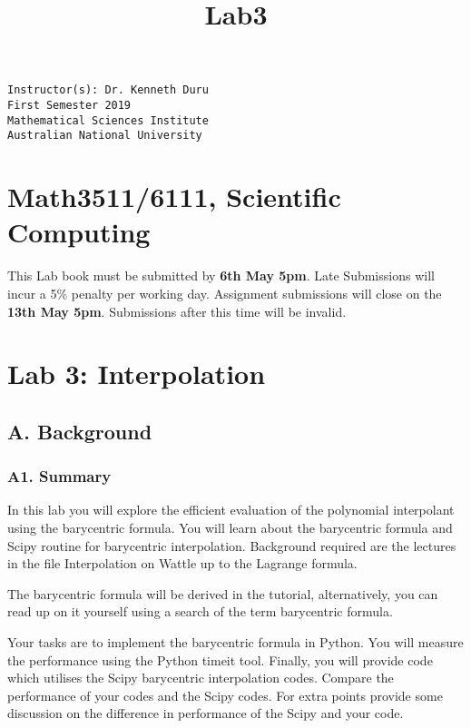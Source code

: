 \documentclass[11pt]{article}
\title{Lab3}
\begin{document}
    
    
    \maketitle
    
    

    
    \begin{verbatim}
Instructor(s): Dr. Kenneth Duru
First Semester 2019
Mathematical Sciences Institute
Australian National University
\end{verbatim}

\section{Math3511/6111, Scientific
Computing}\label{math35116111-scientific-computing}

This Lab book must be submitted by \textbf{6th May 5pm}. Late
Submissions will incur a 5\% penalty per working day. Assignment
submissions will close on the \textbf{13th May 5pm}. Submissions after
this time will be invalid.

\section{Lab 3: Interpolation}\label{lab-3-interpolation}

    \subsection{A. Background}\label{a.-background}

\subsubsection{A1. Summary}\label{a1.-summary}

In this lab you will explore the efficient evaluation of the polynomial
interpolant using the barycentric formula. You will learn about the
barycentric formula and Scipy routine for barycentric interpolation.
Background required are the lectures in the file Interpolation on Wattle
up to the Lagrange formula.

The barycentric formula will be derived in the tutorial, alternatively,
you can read up on it yourself using a search of the term barycentric
formula.

Your tasks are to implement the barycentric formula in Python. You will
measure the performance using the Python timeit tool. Finally, you will
provide code which utilises the Scipy barycentric interpolation codes.
Compare the performance of your codes and the Scipy codes. For extra
points provide some discussion on the difference in performance of the
Scipy and your code.
\end{document}
